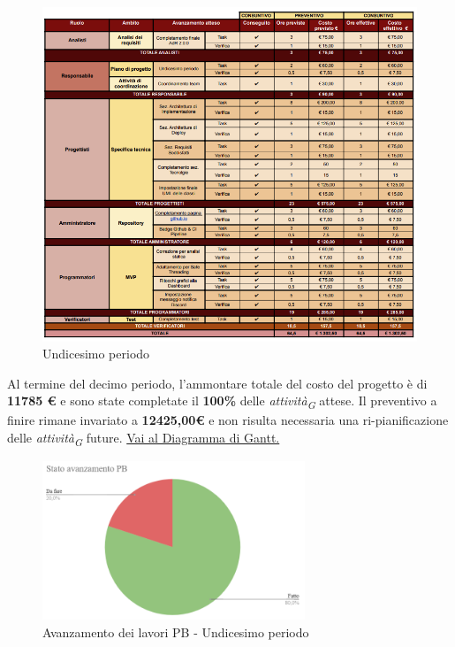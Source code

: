 \begin{figure}[H]
    \centering
    \includegraphics[height=0.9\textwidth]{../Images/tabG11.PNG}
    \caption{Undicesimo periodo}
    \label{fig:Undicesimo_periodo}
\end{figure}

Al termine del decimo periodo, l'ammontare totale del costo del progetto è di \textbf{11785 \euro} e sono state completate il \textbf{100\%} delle \textit{attività}\textsubscript{\textit{G}} attese.
Il preventivo a finire rimane invariato a \textbf{12425,00\euro} e non risulta necessaria una ri-pianificazione delle \textit{attività}\textsubscript{\textit{G}} future.
\href{https://github.com/orgs/ByteOps-swe/projects/3/views/1?sortedBy%5Bdirection%5D=asc&sortedBy%5BcolumnId%5D=64182560}{Vai al Diagramma di Gantt.}

\begin{figure}[H]
    \centering
    \begin{minipage}[b]{0.70\textwidth}
        \centering
        \includegraphics[width=0.7\textwidth]{../Images/torta11.png}
        \caption{Avanzamento dei lavori PB - Undicesimo periodo}
        \label{fig:Avanzamento_PB_11}
    \end{minipage}
\end{figure}

